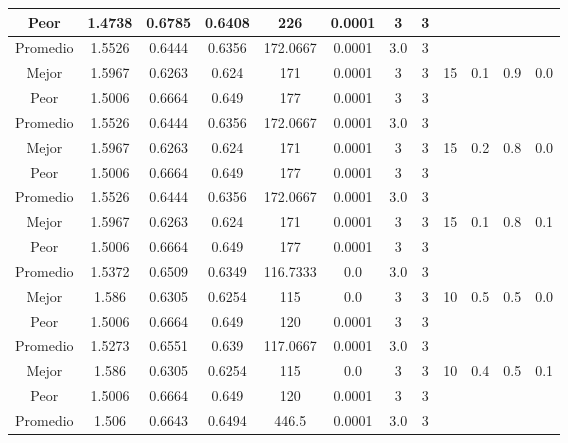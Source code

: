 \begin{table}[h!]
\begin{center}
\begin{tabular}{|c|c|c|c|c|c|c|c|c|c|c|c|}
            Peor & 1.4738 & 0.6785  & 0.6408 & 226 & 0.0001 & 3 & 3 &  &  &  & \\
        \hline
        \hline
            Promedio  & 1.5526 & 0.6444 & 0.6356 & 172.0667 & 0.0001 & 3.0 & 3 &  &  &  & \\
            \cline{1-8}
            Mejor & 1.5967 & 0.6263  & 0.624 & 171 & 0.0001 & 3 & 3 & 15 & 0.1 & 0.9 & 0.0\\
            \cline{1-8}
            Peor & 1.5006 & 0.6664  & 0.649 & 177 & 0.0001 & 3 & 3 &  &  &  & \\
        \hline
        \hline
            Promedio  & 1.5526 & 0.6444 & 0.6356 & 172.0667 & 0.0001 & 3.0 & 3 &  &  &  & \\
            \cline{1-8}
            Mejor & 1.5967 & 0.6263  & 0.624 & 171 & 0.0001 & 3 & 3 & 15 & 0.2 & 0.8 & 0.0\\
            \cline{1-8}
            Peor & 1.5006 & 0.6664  & 0.649 & 177 & 0.0001 & 3 & 3 &  &  &  & \\
        \hline
        \hline
            Promedio  & 1.5526 & 0.6444 & 0.6356 & 172.0667 & 0.0001 & 3.0 & 3 &  &  &  & \\
            \cline{1-8}
            Mejor & 1.5967 & 0.6263  & 0.624 & 171 & 0.0001 & 3 & 3 & 15 & 0.1 & 0.8 & 0.1\\
            \cline{1-8}
            Peor & 1.5006 & 0.6664  & 0.649 & 177 & 0.0001 & 3 & 3 &  &  &  & \\
        \hline
        \hline
            Promedio  & 1.5372 & 0.6509 & 0.6349 & 116.7333 & 0.0 & 3.0 & 3 &  &  &  & \\
            \cline{1-8}
            Mejor & 1.586 & 0.6305  & 0.6254 & 115 & 0.0 & 3 & 3 & 10 & 0.5 & 0.5 & 0.0\\
            \cline{1-8}
            Peor & 1.5006 & 0.6664  & 0.649 & 120 & 0.0001 & 3 & 3 &  &  &  & \\
        \hline
        \hline
            Promedio  & 1.5273 & 0.6551 & 0.639 & 117.0667 & 0.0001 & 3.0 & 3 &  &  &  & \\
            \cline{1-8}
            Mejor & 1.586 & 0.6305  & 0.6254 & 115 & 0.0 & 3 & 3 & 10 & 0.4 & 0.5 & 0.1\\
            \cline{1-8}
            Peor & 1.5006 & 0.6664  & 0.649 & 120 & 0.0001 & 3 & 3 &  &  &  & \\
        \hline
        \hline
            Promedio  & 1.506 & 0.6643 & 0.6494 & 446.5 & 0.0001 & 3.0 & 3 &  &  &  & \\
            \cline{1-8}

\end{tabular}
\end{center}
\end{table}
